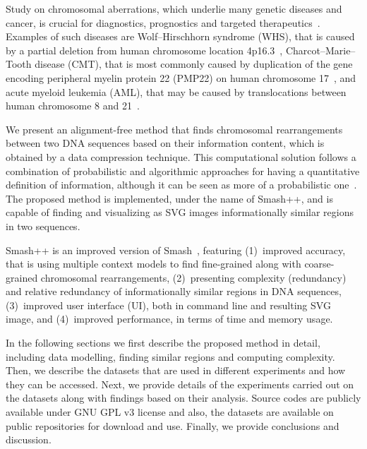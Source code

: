 \documentclass[a4paper,num-refs]{oup-contemporary}
\begin{document}
Study on chromosomal aberrations, which underlie many genetic diseases and cancer, is crucial for diagnostics, prognostics and targeted therapeutics~\cite{theisen2010disorders}. Examples of such diseases are Wolf–Hirschhorn syndrome (WHS), that is caused by a partial deletion from human chromosome location 4p16.3~\cite{dufke2000microdeletion}, Charcot–Marie–Tooth disease (CMT), that is most commonly caused by duplication of the gene encoding peripheral myelin protein 22 (PMP22) on human chromosome 17~\cite{timmerman1992peripheral}, and acute myeloid leukemia (AML), that may be caused by translocations between human chromosome 8 and 21~\cite{huang2006acute}.

We present an alignment-free method that finds chromosomal rearrangements between two DNA sequences based on their information content, which is obtained by a data compression technique. This computational solution follows a combination of probabilistic and algorithmic approaches for having a quantitative definition of information, although it can be seen as more of a probabilistic one~\cite{hosseini2019ac}. The proposed method is implemented, under the name of Smash++, and is capable of finding and visualizing as SVG images informationally similar regions in two sequences.

Smash++ is an improved version of Smash~\cite{pratas2015alignment}, featuring (1)~improved accuracy, that is using multiple context models to find fine-grained along with coarse-grained chromosomal rearrangements, (2)~presenting complexity (redundancy) and relative redundancy of informationally similar regions in DNA sequences, (3)~improved user interface (UI), both in command line and resulting SVG image, and (4)~improved performance, in terms of time and memory usage.

In the following sections we first describe the proposed method in detail, including data modelling, finding similar regions and computing complexity. Then, we describe the datasets that are used in different experiments and how they can be accessed. Next, we provide details of the experiments carried out on the datasets along with findings based on their analysis. Source codes are publicly available under GNU GPL v3 license and also, the datasets are available on public repositories for download and use. Finally, we provide conclusions and discussion.
\end{document}
